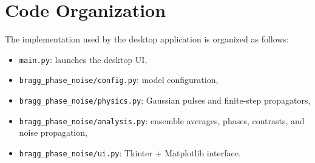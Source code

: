 \documentclass[11pt]{article}
\begin{document}
\section{Code Organization}
The implementation used by the desktop application is organized as follows:
\begin{itemize}[leftmargin=1.5em]
  \item \texttt{main.py}: launches the desktop UI,
  \item \texttt{bragg\_phase\_noise/config.py}: model configuration,
  \item \texttt{bragg\_phase\_noise/physics.py}: Gaussian pulses and finite-step propagators,
  \item \texttt{bragg\_phase\_noise/analysis.py}: ensemble averages, phases, contrasts, and noise propagation,
  \item \texttt{bragg\_phase\_noise/ui.py}: Tkinter + Matplotlib interface.
\end{itemize}
\end{document}
